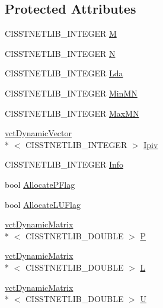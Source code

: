 \subsection*{Protected Attributes}
\begin{DoxyCompactItemize}
\item 
C\-I\-S\-S\-T\-N\-E\-T\-L\-I\-B\-\_\-\-I\-N\-T\-E\-G\-E\-R \hyperlink{classnmr_l_u_solver_ac73ea71a8da30d187017a98e2bcb0e51}{M}
\item 
C\-I\-S\-S\-T\-N\-E\-T\-L\-I\-B\-\_\-\-I\-N\-T\-E\-G\-E\-R \hyperlink{classnmr_l_u_solver_ad757f79f286e11fa14ff4890acfc3ac0}{N}
\item 
C\-I\-S\-S\-T\-N\-E\-T\-L\-I\-B\-\_\-\-I\-N\-T\-E\-G\-E\-R \hyperlink{classnmr_l_u_solver_a11c2f5c7c596efaaa06b6f8df190b0c6}{Lda}
\item 
C\-I\-S\-S\-T\-N\-E\-T\-L\-I\-B\-\_\-\-I\-N\-T\-E\-G\-E\-R \hyperlink{classnmr_l_u_solver_aeeaab59323aae5580e166a6ad23e75d2}{Min\-M\-N}
\item 
C\-I\-S\-S\-T\-N\-E\-T\-L\-I\-B\-\_\-\-I\-N\-T\-E\-G\-E\-R \hyperlink{classnmr_l_u_solver_ac59a365a23fdd52c40d4076efc5f0944}{Max\-M\-N}
\item 
\hyperlink{classvct_dynamic_vector}{vct\-Dynamic\-Vector}\\*
$<$ C\-I\-S\-S\-T\-N\-E\-T\-L\-I\-B\-\_\-\-I\-N\-T\-E\-G\-E\-R $>$ \hyperlink{classnmr_l_u_solver_ad1cd8e579ea67dbebc1586400a82ee58}{Ipiv}
\item 
C\-I\-S\-S\-T\-N\-E\-T\-L\-I\-B\-\_\-\-I\-N\-T\-E\-G\-E\-R \hyperlink{classnmr_l_u_solver_a7a5bf0600413afceac134473b0651698}{Info}
\item 
bool \hyperlink{classnmr_l_u_solver_aedb65694fb1672b67cf4b1e731e3438a}{Allocate\-P\-Flag}
\item 
bool \hyperlink{classnmr_l_u_solver_a34bf65decc10c0ce0b20697404dcb328}{Allocate\-L\-U\-Flag}
\item 
\hyperlink{classvct_dynamic_matrix}{vct\-Dynamic\-Matrix}\\*
$<$ C\-I\-S\-S\-T\-N\-E\-T\-L\-I\-B\-\_\-\-D\-O\-U\-B\-L\-E $>$ \hyperlink{classnmr_l_u_solver_a221f406c2d7cc55ed7f077a2e4c990cb}{P}
\item 
\hyperlink{classvct_dynamic_matrix}{vct\-Dynamic\-Matrix}\\*
$<$ C\-I\-S\-S\-T\-N\-E\-T\-L\-I\-B\-\_\-\-D\-O\-U\-B\-L\-E $>$ \hyperlink{classnmr_l_u_solver_aaf0f1fb37af9ab5edff6fcb7f8244de4}{L}
\item 
\hyperlink{classvct_dynamic_matrix}{vct\-Dynamic\-Matrix}\\*
$<$ C\-I\-S\-S\-T\-N\-E\-T\-L\-I\-B\-\_\-\-D\-O\-U\-B\-L\-E $>$ \hyperlink{classnmr_l_u_solver_a02868ccfffd41664e2883641de95650f}{U}
\end{DoxyCompactItemize}


